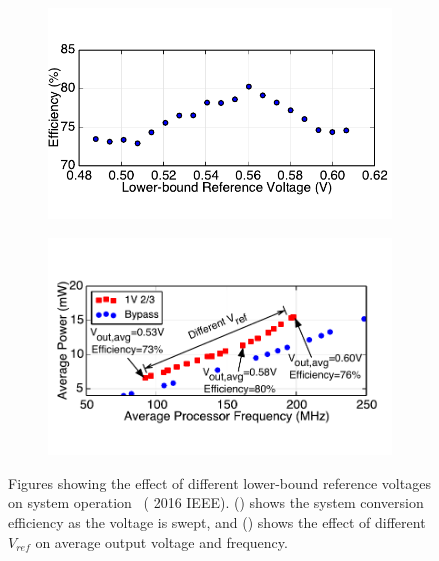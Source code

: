 \documentclass[graybox]{svmult}
\begin{document}
\begin{figure}
  \centering
  \hspace*{\fill}
  \begin{subfigure}[t]{0.45\textwidth}
  \centering
  \includegraphics[width=\textwidth]{6-raven3-dcdc-ref-a}
  \caption{}
  \label{fig:6-raven3-dcdc-ref-a}
  \end{subfigure}
  \hspace*{\fill}
  \begin{subfigure}[t]{0.45\textwidth}
  \centering
  \includegraphics[width=\textwidth]{6-raven3-dcdc-ref-b}
  \caption{}
  \label{fig:6-raven3-dcdc-ref-b}
  \end{subfigure}
  \hspace*{\fill}
  \caption{Figures showing the effect of different lower-bound reference voltages on system operation~\cite{Zimmer2016} ({\textcopyright} 2016 IEEE).  () shows the system conversion efficiency as the voltage is swept, and () shows the effect of different $V_{ref}$ on average output voltage and frequency.}
  \label{fig:6-raven3-dcdc-ref}
\end{figure}
\end{document}
